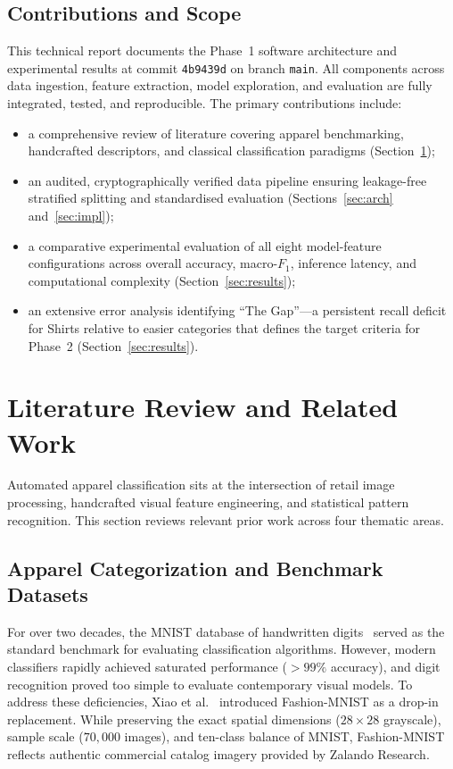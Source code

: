 \documentclass[conference]{IEEEtran}
\newcommand{\code}[1]{\texttt{#1}}
\begin{document}
\subsection{Contributions and Scope}
This technical report documents the Phase~1 software architecture and
experimental results at commit \code{4b9439d} on branch \code{main}. All
components across data ingestion, feature extraction, model exploration,
and evaluation are fully integrated, tested, and reproducible. The primary
contributions include:
\begin{itemize}
  \item a comprehensive review of literature covering apparel benchmarking,
    handcrafted descriptors, and classical classification paradigms
    (Section~\ref{sec:litreview});
  \item an audited, cryptographically verified data pipeline ensuring
    leakage-free stratified splitting and standardised evaluation
    (Sections~\ref{sec:arch} and~\ref{sec:impl});
  \item a comparative experimental evaluation of all eight model-feature
    configurations across overall accuracy, macro-$F_1$, inference
    latency, and computational complexity (Section~\ref{sec:results});
  \item an extensive error analysis identifying ``The Gap''---a
    persistent recall deficit for Shirts relative to easier categories
    that defines the target criteria for Phase~2 (Section~\ref{sec:results}).
\end{itemize}

\section{Literature Review and Related Work}
\label{sec:litreview}

Automated apparel classification sits at the intersection of retail image
processing, handcrafted visual feature engineering, and statistical
pattern recognition. This section reviews relevant prior work across four
thematic areas.

\subsection{Apparel Categorization and Benchmark Datasets}
For over two decades, the MNIST database of handwritten
digits~\cite{lecun1998mnist} served as the standard benchmark for
evaluating classification algorithms. However, modern classifiers rapidly
achieved saturated performance ($>99\%$ accuracy), and digit recognition
proved too simple to evaluate contemporary visual models. To address these
deficiencies, Xiao et al.~\cite{xiao2017fashion} introduced Fashion-MNIST
as a drop-in replacement. While preserving the exact spatial dimensions
($28\times 28$ grayscale), sample scale ($70{,}000$ images), and ten-class
balance of MNIST, Fashion-MNIST reflects authentic commercial catalog
imagery provided by Zalando Research.
\end{document}
